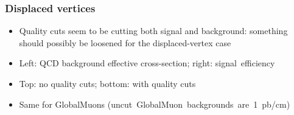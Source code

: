 \documentclass[compress]{beamer}
\begin{document}
\begin{frame}
\frametitle{Displaced vertices}
\begin{itemize}
\item Quality cuts seem to be cutting both signal and background:
  something should possibly be loosened for the displaced-vertex case
\item Left: QCD background effective cross-section; right: \mbox{signal efficiency\hspace{-1 cm}}
\item Top: no quality cuts; bottom: with quality cuts
\item<2> Same for GlobalMuons \mbox{(uncut GlobalMuon backgrounds are 1~pb/cm)\hspace{-1 cm}}
\end{itemize}

\begin{center}
\end{center}
\end{frame}
\end{document}
